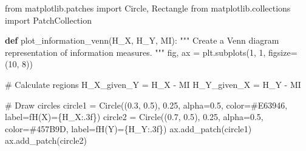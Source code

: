 \documentclass[
  11pt,
  letterpaper,
  oneside,
  openany]{book}
\newenvironment{Shaded}{\begin{snugshade}}{\end{snugshade}}
\newcommand{\CommentTok}[1]{\textcolor[rgb]{0.37,0.37,0.37}{#1}}
\newcommand{\DecValTok}[1]{\textcolor[rgb]{0.68,0.00,0.00}{#1}}
\newcommand{\FloatTok}[1]{\textcolor[rgb]{0.68,0.00,0.00}{#1}}
\newcommand{\ImportTok}[1]{\textcolor[rgb]{0.00,0.46,0.62}{#1}}
\newcommand{\KeywordTok}[1]{\textcolor[rgb]{0.00,0.23,0.31}{\textbf{#1}}}
\newcommand{\NormalTok}[1]{\textcolor[rgb]{0.00,0.23,0.31}{#1}}
\newcommand{\OperatorTok}[1]{\textcolor[rgb]{0.37,0.37,0.37}{#1}}
\newcommand{\SpecialCharTok}[1]{\textcolor[rgb]{0.37,0.37,0.37}{#1}}
\newcommand{\SpecialStringTok}[1]{\textcolor[rgb]{0.13,0.47,0.30}{#1}}
\newcommand{\StringTok}[1]{\textcolor[rgb]{0.13,0.47,0.30}{#1}}
\begin{document}
\begin{Shaded}
\begin{Highlighting}[]
\ImportTok{from}\NormalTok{ matplotlib.patches }\ImportTok{import}\NormalTok{ Circle, Rectangle}
\ImportTok{from}\NormalTok{ matplotlib.collections }\ImportTok{import}\NormalTok{ PatchCollection}

\KeywordTok{def}\NormalTok{ plot\_information\_venn(H\_X, H\_Y, MI):}
    \CommentTok{"""}
\CommentTok{    Create a Venn diagram representation of information measures.}
\CommentTok{    """}
\NormalTok{    fig, ax }\OperatorTok{=}\NormalTok{ plt.subplots(}\DecValTok{1}\NormalTok{, }\DecValTok{1}\NormalTok{, figsize}\OperatorTok{=}\NormalTok{(}\DecValTok{10}\NormalTok{, }\DecValTok{8}\NormalTok{))}
    
    \CommentTok{\# Calculate regions}
\NormalTok{    H\_X\_given\_Y }\OperatorTok{=}\NormalTok{ H\_X }\OperatorTok{{-}}\NormalTok{ MI}
\NormalTok{    H\_Y\_given\_X }\OperatorTok{=}\NormalTok{ H\_Y }\OperatorTok{{-}}\NormalTok{ MI}
    
    \CommentTok{\# Draw circles}
\NormalTok{    circle1 }\OperatorTok{=}\NormalTok{ Circle((}\FloatTok{0.3}\NormalTok{, }\FloatTok{0.5}\NormalTok{), }\FloatTok{0.25}\NormalTok{, alpha}\OperatorTok{=}\FloatTok{0.5}\NormalTok{, color}\OperatorTok{=}\StringTok{\textquotesingle{}\#E63946\textquotesingle{}}\NormalTok{, label}\OperatorTok{=}\SpecialStringTok{f\textquotesingle{}H(X)=}\SpecialCharTok{\{}\NormalTok{H\_X}\SpecialCharTok{:.3f\}}\SpecialStringTok{\textquotesingle{}}\NormalTok{)}
\NormalTok{    circle2 }\OperatorTok{=}\NormalTok{ Circle((}\FloatTok{0.7}\NormalTok{, }\FloatTok{0.5}\NormalTok{), }\FloatTok{0.25}\NormalTok{, alpha}\OperatorTok{=}\FloatTok{0.5}\NormalTok{, color}\OperatorTok{=}\StringTok{\textquotesingle{}\#457B9D\textquotesingle{}}\NormalTok{, label}\OperatorTok{=}\SpecialStringTok{f\textquotesingle{}H(Y)=}\SpecialCharTok{\{}\NormalTok{H\_Y}\SpecialCharTok{:.3f\}}\SpecialStringTok{\textquotesingle{}}\NormalTok{)}
\NormalTok{    ax.add\_patch(circle1)}
\NormalTok{    ax.add\_patch(circle2)}
    

\end{Highlighting}
\end{Shaded}
\end{document}
